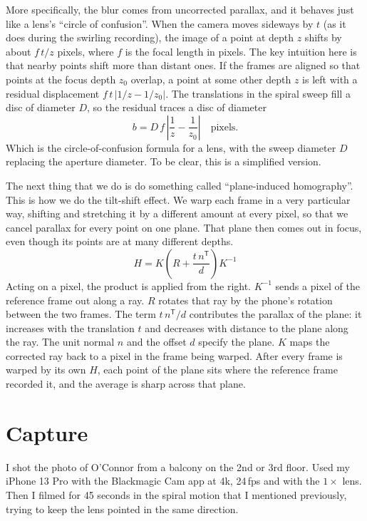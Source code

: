 \documentclass[11pt]{article}
\begin{document}
More specifically, the blur comes from uncorrected parallax, and it behaves just like a lens's ``circle of confusion''. When the camera moves sideways by $t$ (as it does during the swirling recording), the image of a point at depth $z$ shifts by about $f\,t/z$ pixels, where $f$ is the focal length in pixels. The key intuition here is that nearby points shift more than distant ones. If the frames are aligned so that points at the focus depth $z_0$ overlap, a point at some other depth $z$ is left with a residual displacement $f\,t\,|1/z - 1/z_0|$. The translations in the spiral sweep fill a disc of diameter $D$, so the residual traces a disc of diameter
\begin{equation*}
b = D \, f \, \left| \frac{1}{z} - \frac{1}{z_0} \right| \quad \text{pixels.}
\end{equation*}
Which is the circle-of-confusion formula for a lens, with the sweep diameter $D$ replacing the aperture diameter. To be clear, this is a simplified version.

The next thing that we do is do something called ``plane-induced homography''. This is how we do the tilt-shift effect. We warp each frame in a very particular way, shifting and stretching it by a different amount at every pixel, so that we cancel parallax for every point on one plane. That plane then comes out in focus, even though its points are at many different depths.
\begin{equation*}
H = K \left( R + \frac{t\, n^{\mathsf T}}{d} \right) K^{-1}
\end{equation*}
Acting on a pixel, the product is applied from the right. $K^{-1}$ sends a pixel of the reference frame out along a ray. $R$ rotates that ray by the phone's rotation between the two frames. The term $t\,n^{\mathsf T}/d$ contributes the parallax of the plane: it increases with the translation $t$ and decreases with distance to the plane along the ray. The unit normal $n$ and the offset $d$ specify the plane. $K$ maps the corrected ray back to a pixel in the frame being warped. After every frame is warped by its own $H$, each point of the plane sits where the reference frame recorded it, and the average is sharp across that plane.

\section{Capture}
I shot the photo of O'Connor from a balcony on the 2nd or 3rd floor. Used my iPhone 13 Pro with the Blackmagic Cam app at 4k, 24\,fps and with the $1\times$ lens. Then I filmed for 45 seconds in the spiral motion that I mentioned previously, trying to keep the lens pointed in the same direction.
\end{document}
